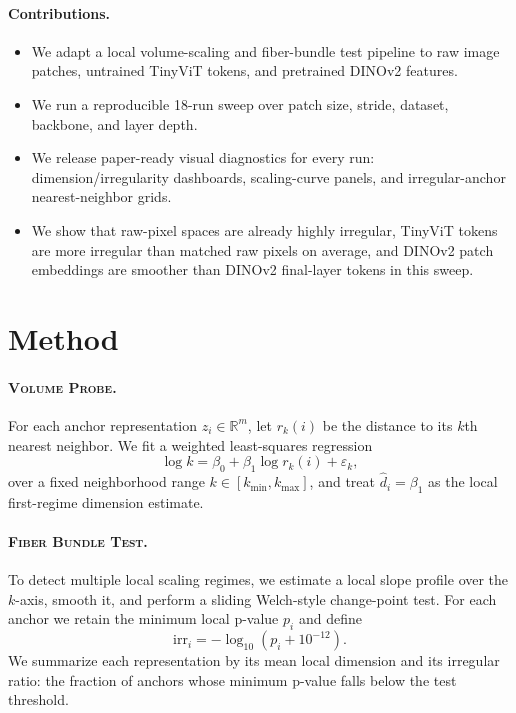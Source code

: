 \documentclass{article}
\newcommand{\method}{\textsc{Volume Probe}}
\newcommand{\fiber}{\textsc{Fiber Bundle Test}}
\newcommand{\dimhat}{\widehat{d}}
\newcommand{\irr}{\mathrm{irr}}
\newcommand{\R}{\mathbb{R}}
\begin{document}
\paragraph{Contributions.}
\begin{itemize}[leftmargin=1.5em]
\item We adapt a local volume-scaling and fiber-bundle test pipeline to raw image patches, untrained TinyViT tokens, and pretrained DINOv2 features.
\item We run a reproducible 18-run sweep over patch size, stride, dataset, backbone, and layer depth.
\item We release paper-ready visual diagnostics for every run: dimension/irregularity dashboards, scaling-curve panels, and irregular-anchor nearest-neighbor grids.
\item We show that raw-pixel spaces are already highly irregular, TinyViT tokens are more irregular than matched raw pixels on average, and DINOv2 patch embeddings are smoother than DINOv2 final-layer tokens in this sweep.
\end{itemize}

\section{Method}
\paragraph{\method.}
For each anchor representation $z_i \in \R^m$, let $r_k(i)$ be the distance to its $k$th nearest neighbor. We fit a weighted least-squares regression
\begin{equation}
  \log k = \beta_0 + \beta_1 \log r_k(i) + \varepsilon_k,
\end{equation}
over a fixed neighborhood range $k \in [k_{\min}, k_{\max}]$, and treat $\dimhat_i = \beta_1$ as the local first-regime dimension estimate.

\paragraph{\fiber.}
To detect multiple local scaling regimes, we estimate a local slope profile over the $k$-axis, smooth it, and perform a sliding Welch-style change-point test. For each anchor we retain the minimum local p-value $p_i$ and define
\begin{equation}
  \irr_i = -\log_{10}(p_i + 10^{-12}).
\end{equation}
We summarize each representation by its mean local dimension and its irregular ratio: the fraction of anchors whose minimum p-value falls below the test threshold.
\end{document}

